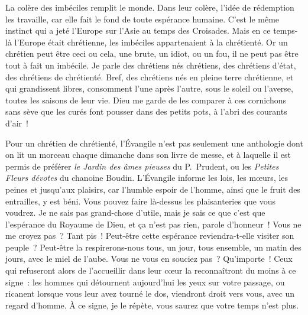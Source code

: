 \documentclass[french,twoside]{book} %
\newcommand{\astertri}{\medskip\par\centerline{\color{rubric}\large\selectfont{\syms ✻\,✻\,✻}}\medskip\par}%
\begin{document}
\noindent La colère des imbéciles remplit le monde. Dans leur colère, l’idée de rédemption les travaille, car elle fait le fond de toute espérance humaine. C’est le même instinct qui a jeté l’Europe sur l’Asie au temps des Croisades. Mais en ce temps-là l’Europe était chrétienne, les imbéciles appartenaient à la chrétienté. Or un chrétien peut être ceci ou cela, une brute, un idiot, ou un fou, il ne peut pas être tout à fait un imbécile. Je parle des chrétiens nés chrétiens, des chrétiens d’état, des chrétiens de chrétienté. Bref, des chrétiens nés en pleine terre chrétienne, et qui grandissent libres, consomment l’une après l’autre, sous le soleil ou l’averse, toutes les saisons de leur vie. Dieu me garde de les comparer à ces cornichons sans sève que les curés font pousser dans des petits pots, à l’abri des courants d’air !\par
Pour un chrétien de chrétienté, l’Évangile n’est pas seulement une anthologie dont on lit un morceau chaque dimanche dans son livre de messe, et à laquelle il est permis de préférer \emph{le Jardin des âmes pieuses} du P. Prudent, ou les \emph{Petites Fleurs dévotes} du chanoine Boudin. L’Évangile informe les lois, les mœurs, les peines et jusqu’aux plaisirs, car l’humble espoir de l’homme, ainsi que le fruit des entrailles, y est béni. Vous pouvez faire là-dessus les plaisanteries que vous voudrez. Je ne sais pas grand-chose d’utile, mais je sais ce que c’est que l’espérance du Royaume de Dieu, et ça n’est pas rien, parole d’honneur ! Vous ne me croyez pas ? Tant pis ! Peut-être cette espérance reviendra-t-elle visiter son peuple ? Peut-être la respirerons-nous tous, un jour, tous ensemble, un matin des jours, avec le miel de l’aube. Vous ne vous en souciez pas ? Qu’importe ! Ceux qui refuseront alors de l’accueillir dans leur cœur la reconnaîtront du moins à ce signe : les hommes qui détournent aujourd’hui les yeux sur votre passage, ou ricanent lorsque vous leur avez tourné le dos, viendront droit vers vous, avec un regard d’homme. À ce signe, je le répète, vous saurez que votre temps n’est plus.\par

\astertri
\end{document}
